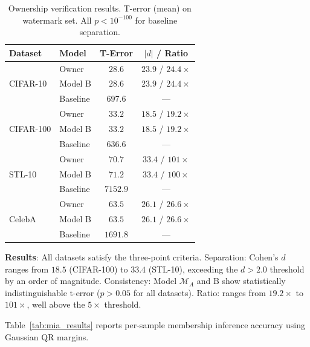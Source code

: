 \documentclass{article}
\begin{document}
\begin{table}[t]
\caption{Ownership verification results. T-error (mean) on watermark set. All $p < 10^{-100}$ for baseline separation.}
\label{tab:main_results}
\vskip 0.1in
\begin{center}
\begin{small}
\begin{tabular}{@{}llcc@{}}
\toprule
Dataset & Model & T-Error & $|d|$ / Ratio \\
\midrule
\multirow{3}{*}{CIFAR-10}
& Owner & $28.6$ & $23.9$ / $24.4\times$ \\
& Model B & $28.6$ & $23.9$ / $24.4\times$ \\
& Baseline & $697.6$ & --- \\
\midrule
\multirow{3}{*}{CIFAR-100}
& Owner & $33.2$ & $18.5$ / $19.2\times$ \\
& Model B & $33.2$ & $18.5$ / $19.2\times$ \\
& Baseline & $636.6$ & --- \\
\midrule
\multirow{3}{*}{STL-10}
& Owner & $70.7$ & $33.4$ / $101\times$ \\
& Model B & $71.2$ & $33.4$ / $100\times$ \\
& Baseline & $7152.9$ & --- \\
\midrule
\multirow{3}{*}{CelebA}
& Owner & $63.5$ & $26.1$ / $26.6\times$ \\
& Model B & $63.5$ & $26.1$ / $26.6\times$ \\
& Baseline & $1691.8$ & --- \\
\bottomrule
\end{tabular}
\end{small}
\end{center}
\vskip -0.1in
\end{table}

\textbf{Results}: All datasets satisfy the three-point criteria. Separation: Cohen's $d$ ranges from $18.5$ (CIFAR-100) to $33.4$ (STL-10), exceeding the $d > 2.0$ threshold by an order of magnitude. Consistency: Model $\mathcal{M}_A$ and B show statistically indistinguishable t-error ($p > 0.05$ for all datasets). Ratio: ranges from $19.2\times$ to $101\times$, well above the $5\times$ threshold.

Table~\ref{tab:mia_results} reports per-sample membership inference accuracy using Gaussian QR margins.
\end{document}
